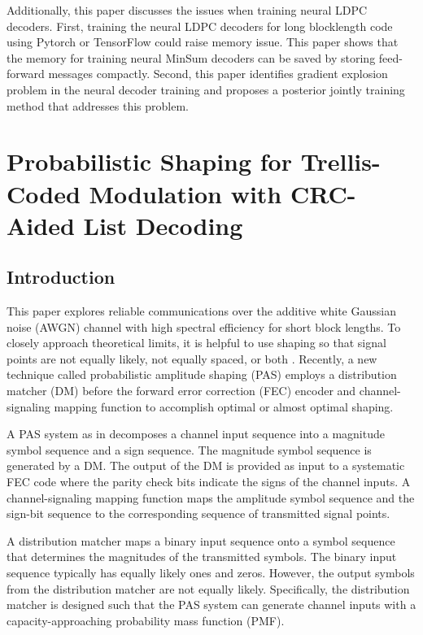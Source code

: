 \documentclass [PhD] {uclathes}
\begin{document}
Additionally, this paper discusses the issues when training neural LDPC decoders. First, training the neural LDPC decoders for long blocklength code using Pytorch or TensorFlow could raise memory issue. This paper shows that the memory for training neural MinSum decoders can be saved by storing feed-forward messages compactly. Second, this paper identifies gradient explosion problem in the neural decoder training and proposes a  posterior jointly training method that addresses this problem. 


\chapter{Probabilistic Shaping for Trellis-Coded Modulation with CRC-Aided List Decoding} \label{cpt: CRC_TCM_PAS}

\section{Introduction}
This paper explores reliable communications over the additive white Gaussian noise (AWGN) channel with high spectral efficiency for short block lengths.  To closely approach theoretical limits, it is helpful to use shaping so that signal points are not equally likely, not equally spaced, or both \cite{gallager1968information,ForneyShaping,forney1992trellis,Kschischangoptimaldist,laroia1994optimal,fragouli2001,xiao2021finite}.  Recently, a new technique called  probabilistic amplitude shaping (PAS) \cite{pas_bocherer_1,pas_bocherer_2} employs a distribution matcher (DM) \cite{CCDM_schulte} before the forward error correction (FEC) encoder and channel-signaling mapping function to accomplish optimal or almost optimal shaping.

A PAS system as in \cite{pas_bocherer_1,pas_bocherer_2} decomposes a channel input sequence into a magnitude symbol sequence and a sign sequence. The magnitude symbol sequence is generated by a DM.  The output of the DM is provided as input to a systematic FEC code where the parity check bits indicate the signs of the channel inputs. A channel-signaling mapping function maps the amplitude symbol sequence and the sign-bit sequence to the corresponding sequence of transmitted signal points.

A distribution matcher \cite{CCDM_schulte,SMDM_amjad,ccdm_smdm_comp_schulte,patrick,pikus2019arithmetic,fehenberger2018multiset} maps a binary  input sequence onto a symbol sequence that determines the magnitudes of the transmitted symbols. The  binary input sequence typically has equally likely ones and zeros. However, the output symbols from  the distribution matcher are not equally likely. Specifically, the distribution matcher is designed such that the PAS system can generate channel inputs with a capacity-approaching probability mass function (PMF). 
\end{document}
